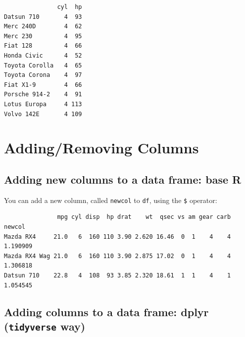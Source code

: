 \documentclass[
]{article}
\newenvironment{Shaded}{\begin{snugshade}}{\end{snugshade}}
\newcommand{\DecValTok}[1]{\textcolor[rgb]{0.00,0.00,0.81}{#1}}
\newcommand{\FloatTok}[1]{\textcolor[rgb]{0.00,0.00,0.81}{#1}}
\newcommand{\FunctionTok}[1]{\textcolor[rgb]{0.00,0.00,0.00}{#1}}
\newcommand{\NormalTok}[1]{#1}
\newcommand{\OtherTok}[1]{\textcolor[rgb]{0.56,0.35,0.01}{#1}}
\newcommand{\SpecialCharTok}[1]{\textcolor[rgb]{0.00,0.00,0.00}{#1}}
\begin{document}
\begin{verbatim}
               cyl  hp
Datsun 710       4  93
Merc 240D        4  62
Merc 230         4  95
Fiat 128         4  66
Honda Civic      4  52
Toyota Corolla   4  65
Toyota Corona    4  97
Fiat X1-9        4  66
Porsche 914-2    4  91
Lotus Europa     4 113
Volvo 142E       4 109
\end{verbatim}

\hypertarget{addingremoving-columns}{%
\section{Adding/Removing Columns}\label{addingremoving-columns}}

\hypertarget{adding-new-columns-to-a-data-frame-base-r}{%
\subsection{Adding new columns to a data frame: base
R}\label{adding-new-columns-to-a-data-frame-base-r}}

You can add a new column, called \texttt{newcol} to \texttt{df}, using
the \texttt{\$} operator:

\begin{Shaded}
\end{Shaded}

\begin{verbatim}
               mpg cyl disp  hp drat    wt  qsec vs am gear carb   newcol
Mazda RX4     21.0   6  160 110 3.90 2.620 16.46  0  1    4    4 1.190909
Mazda RX4 Wag 21.0   6  160 110 3.90 2.875 17.02  0  1    4    4 1.306818
Datsun 710    22.8   4  108  93 3.85 2.320 18.61  1  1    4    1 1.054545
\end{verbatim}

\hypertarget{adding-columns-to-a-data-frame-dplyr-tidyverse-way}{%
\subsection{\texorpdfstring{Adding columns to a data frame: dplyr
(\texttt{tidyverse}
way)}{Adding columns to a data frame: dplyr (tidyverse way)}}\label{adding-columns-to-a-data-frame-dplyr-tidyverse-way}}
\end{document}
